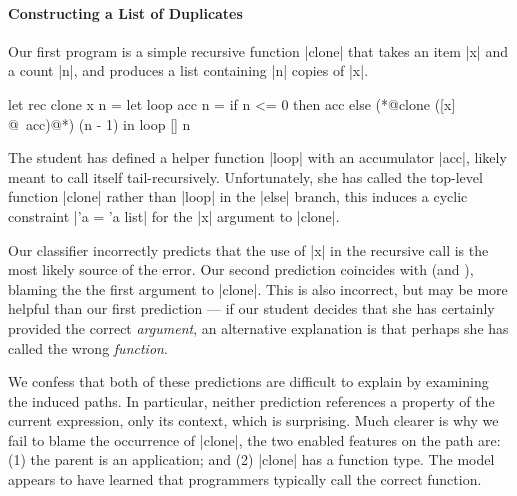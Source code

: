 \paragraph{Constructing a List of Duplicates}
Our first program is a simple recursive function |clone| that takes an
item |x| and a count |n|, and produces a list containing |n| copies of
|x|.
%
\begin{ecode}
  let rec clone x n =
    let loop acc n =
      if n <= 0 then
        acc
      else
        (*@\colorbox{fix!75}{clone} \colorbox{sherrloc!75}{([\colorbox{tree!75}{x}] @\ acc)}@*) (n - 1) in
    loop [] n
\end{ecode}
%
The student has defined a helper function |loop| with an accumulator
|acc|, likely meant to call itself tail-recursively.
%
Unfortunately, she has called the top-level function |clone| rather than
|loop| in the |else| branch, this induces a cyclic constraint |'a = 'a list|
for the |x| argument to |clone|.

Our classifier incorrectly predicts that the use of |x| in the recursive
call is the most likely source of the error.
%
Our second prediction coincides with \sherrloc (and \ocaml), blaming the
the first argument to |clone|.
%
This is also incorrect, but may be more helpful than our first
prediction --- if our student decides that she has certainly provided
the correct \emph{argument}, an alternative explanation is that
perhaps she has called the wrong \emph{function}.

We confess that both of these predictions are difficult to explain by
examining the induced paths.
%
In particular, neither prediction references a property of the current
expression, only its context, which is surprising.
%
Much clearer is why we fail to blame the occurrence of |clone|, the two
enabled features on the path are:
%
(1) the parent is an application; and
%
(2) |clone| has a function type.
%
The model appears to have learned that programmers typically call the
correct function.

